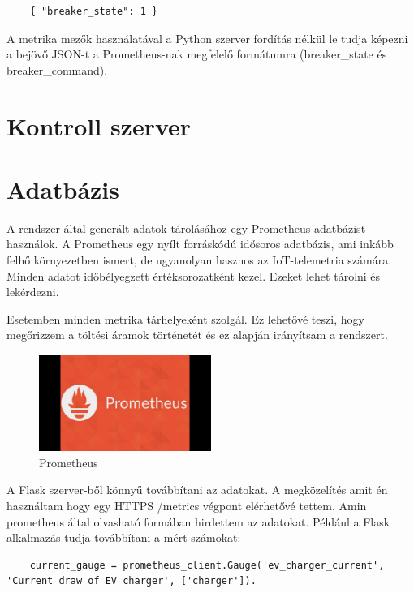 \begin{lstlisting}
    { "breaker_state": 1 }
\end{lstlisting}

A metrika mezők használatával a Python szerver fordítás nélkül le tudja képezni a 
bejövő JSON-t a Prometheus-nak megfelelő formátumra 
(breaker\_state és breaker\_command).

\section{Kontroll szerver}

\section{Adatbázis}

A rendszer által generált adatok tárolásához egy Prometheus adatbázist használok. 
A Prometheus egy nyílt forráskódú idősoros adatbázis, ami inkább felhő környezetben ismert, 
de ugyanolyan hasznos az IoT-telemetria számára. Minden adatot időbélyegzett értéksorozatként kezel.
Ezeket lehet tárolni és lekérdezni.
\cite{electrofunsmart:iotserver}
\cite{prometheus:dimenzionális}

Esetemben minden metrika tárhelyeként szolgál. Ez lehetővé teszi, 
hogy megőrizzem a töltési áramok történetét és ez alapján irányítsam a rendszert.

\begin{figure}[!ht]
    \centering
    \includegraphics[width=0.5\textwidth, keepaspectratio]{figures/maxresdefault.jpg}
    \caption{Prometheus \cite{youtube:someid}} 
\end{figure}

A Flask szerver-ből könnyű továbbítani az adatokat. A megközelítés amit én használtam hogy egy HTTPS /metrics 
végpont elérhetővé tettem. Amin prometheus által olvasható formában hirdettem az adatokat. 
Például a Flask alkalmazás tudja továbbítani a mért számokat:
\begin{lstlisting}
    current_gauge = prometheus_client.Gauge('ev_charger_current', 'Current draw of EV charger', ['charger']). 
\end{lstlisting}

